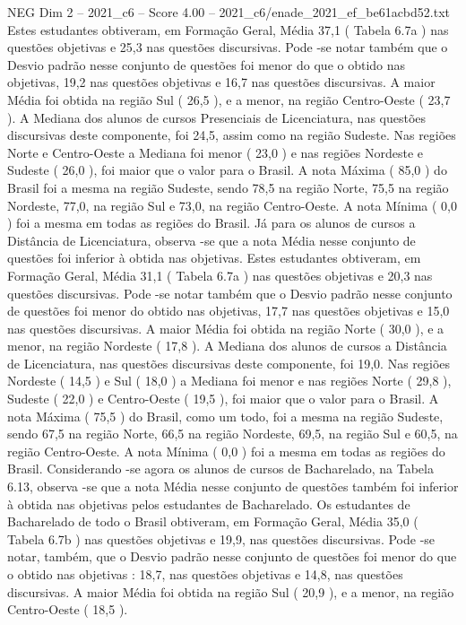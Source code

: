 \begin{textsample}{NEG Dim 2 – 2021\_c6 – Score 4.00 – 2021\_c6/enade\_2021\_ef\_be61acbd52.txt}
Estes estudantes obtiveram, em Formação Geral, Média 37,1 ( Tabela 6.7a ) nas questões objetivas e 25,3 nas questões discursivas.
Pode -se notar também que o Desvio padrão nesse conjunto de questões foi menor do que o obtido nas objetivas, 19,2 nas questões objetivas e 16,7 nas questões discursivas.
A maior Média foi obtida na região Sul ( 26,5 ), e a menor, na região Centro-Oeste ( 23,7 ).
A Mediana dos alunos de cursos Presenciais de Licenciatura, nas questões discursivas deste componente, foi 24,5, assim como na região Sudeste.
Nas regiões Norte e Centro-Oeste a Mediana foi menor ( 23,0 ) e nas regiões Nordeste e Sudeste ( 26,0 ), foi maior que o valor para o Brasil.
A nota Máxima ( 85,0 ) do Brasil foi a mesma na região Sudeste, sendo 78,5 na região Norte, 75,5 na região Nordeste, 77,0, na região Sul e 73,0, na região Centro-Oeste.
A nota Mínima ( 0,0 ) foi a mesma em todas as regiões do Brasil.
Já para os alunos de cursos a Distância de Licenciatura, observa -se que a nota Média nesse conjunto de questões foi inferior à obtida nas objetivas.
Estes estudantes obtiveram, em Formação Geral, Média 31,1 ( Tabela 6.7a ) nas questões objetivas e 20,3 nas questões discursivas.
Pode -se notar também que o Desvio padrão nesse conjunto de questões foi menor do obtido nas objetivas, 17,7 nas questões objetivas e 15,0 nas questões discursivas.
A maior Média foi obtida na região Norte ( 30,0 ), e a menor, na região Nordeste ( 17,8 ).
A Mediana dos alunos de cursos a Distância de Licenciatura, nas questões discursivas deste componente, foi 19,0.
Nas regiões Nordeste ( 14,5 ) e Sul ( 18,0 ) a Mediana foi menor e nas regiões Norte ( 29,8 ), Sudeste ( 22,0 ) e Centro-Oeste ( 19,5 ), foi maior que o valor para o Brasil.
A nota Máxima ( 75,5 ) do Brasil, como um todo, foi a mesma na região Sudeste, sendo 67,5 na região Norte, 66,5 na região Nordeste, 69,5, na região Sul e 60,5, na região Centro-Oeste.
A nota Mínima ( 0,0 ) foi a mesma em todas as regiões do Brasil.
Considerando -se agora os alunos de cursos de Bacharelado, na Tabela 6.13, observa -se que a nota Média nesse conjunto de questões também foi inferior à obtida nas objetivas pelos estudantes de Bacharelado.
Os estudantes de Bacharelado de todo o Brasil obtiveram, em Formação Geral, Média 35,0 ( Tabela 6.7b ) nas questões objetivas e 19,9, nas questões discursivas.
Pode -se notar, também, que o Desvio padrão nesse conjunto de questões foi menor do que o obtido nas objetivas : 18,7, nas questões objetivas e 14,8, nas questões discursivas.
A maior Média foi obtida na região Sul ( 20,9 ), e a menor, na região Centro-Oeste ( 18,5 ).

\end{textsample}
